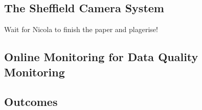 \subsection{The Sheffield Camera System}\label{sec:35tCameraSystem}

Wait for Nicola to finish the paper and plagerise!

\subsection{Online Monitoring for Data Quality Monitoring}\label{sec:35tOnlineMonitoring}

\subsection{Outcomes}\label{sec:35tPhaseIIOutcomes}





































